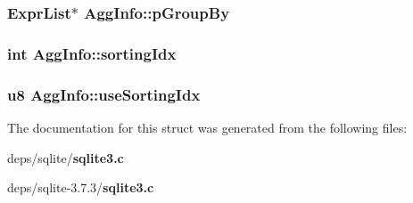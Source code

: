 \subsubsection{\setlength{\rightskip}{0pt plus 5cm}\bf{Expr\-List}$\ast$ \bf{Agg\-Info::p\-Group\-By}}\label{structAggInfo_9b968593a2e54b9be5119944888c123c}


\subsubsection{\setlength{\rightskip}{0pt plus 5cm}int \bf{Agg\-Info::sorting\-Idx}}\label{structAggInfo_ae06feb760c1ab1aeb49f3f77636eb2f}


\subsubsection{\setlength{\rightskip}{0pt plus 5cm}\bf{u8} \bf{Agg\-Info::use\-Sorting\-Idx}}\label{structAggInfo_bc42c51bfcc7e58c2d20723ab36052ba}




The documentation for this struct was generated from the following files:\begin{CompactItemize}
\item 
deps/sqlite/\bf{sqlite3.c}\item 
deps/sqlite-3.7.3/\bf{sqlite3.c}\end{CompactItemize}

